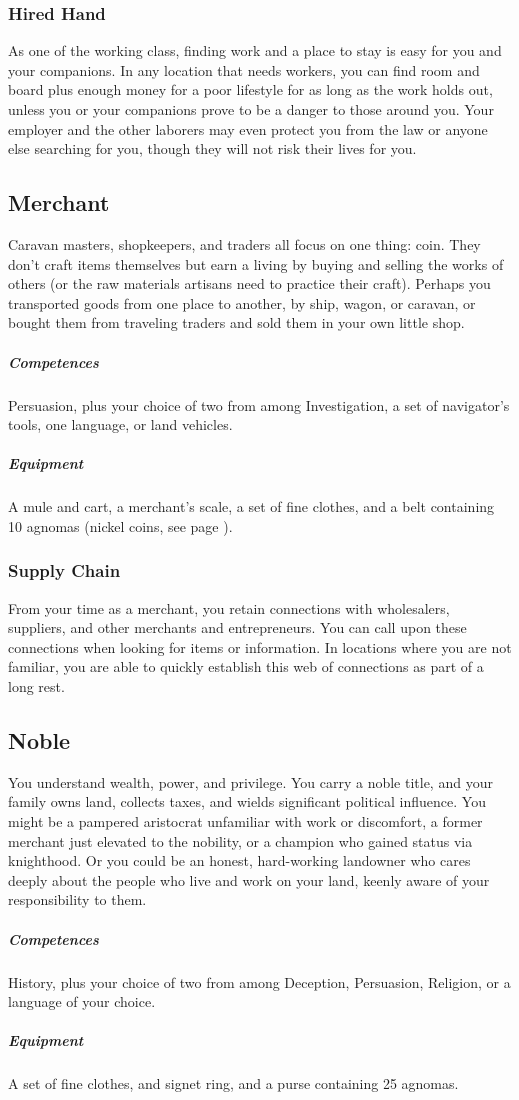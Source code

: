     \subsubsection{Hired Hand}
        As one of the working class, finding work and a place to stay is easy for you and your companions.
        In any location that needs workers, you can find room and board plus enough money for a poor lifestyle for as long as the work holds out, unless you or your companions prove to be a danger to those around you.
        Your employer and the other laborers may even protect you from the law or anyone else searching for you, though they will not risk their lives for you.

\subsection*{Merchant} \label{ssec::merchant}
    Caravan masters, shopkeepers, and traders all focus on one thing: coin.
    They don't craft items themselves but earn a living by buying and selling the works of others (or the raw materials artisans need to practice their craft).
    Perhaps you transported goods from one place to another, by ship, wagon, or caravan, or bought them from traveling traders and sold them in your own little shop.
    \subparagraph{Competences} Persuasion, plus your choice of two from among Investigation, a set of navigator's tools, one language, or land vehicles.
    \subparagraph{Equipment} A mule and cart, a merchant's scale, a set of fine clothes, and a belt containing 10 agnomas (nickel coins, see page \pageref{sec::currency}).
    \subsubsection{Supply Chain} \label{feat::supplychain}
        From your time as a merchant, you retain connections with wholesalers, suppliers, and other merchants and entrepreneurs.
        You can call upon these connections when looking for items or information.
        In locations where you are not familiar, you are able to quickly establish this web of connections as part of a long rest.

\subsection*{Noble} \label{ssec::noble}
    You understand wealth, power, and privilege.
    You carry a noble title, and your family owns land, collects taxes, and wields significant political influence.
    You might be a pampered aristocrat unfamiliar with work or discomfort, a former merchant just elevated to the nobility, or a champion who gained status via knighthood.
    Or you could be an honest, hard-working landowner who cares deeply about the people who live and work on your land, keenly aware of your responsibility to them.
    \subparagraph{Competences} History, plus your choice of two from among Deception, Persuasion, Religion, or a language of your choice.
    \subparagraph{Equipment} A set of fine clothes, and signet ring, and a purse containing 25 agnomas.
